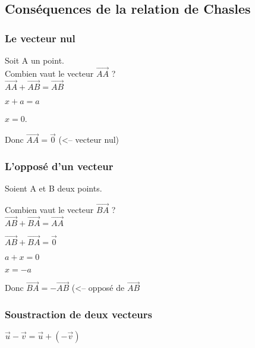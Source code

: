 \subsection{Conséquences de la relation de Chasles}

\subsubsection{Le vecteur nul}

Soit A un point. \\

Combien vaut le vecteur $\overrightarrow{AA}$ ? \\


$\overrightarrow{AA} + \overrightarrow{AB} = \overrightarrow{AB}$

$ x + a = a $

$ x = 0 $.

Donc $\overrightarrow{AA} = \overrightarrow{0}$ (<-- vecteur nul) \\

\subsubsection{L'opposé d'un vecteur}

Soient A et B deux points.


Combien vaut le vecteur $\overrightarrow{BA}$ ? \\


$\overrightarrow{AB} + \overrightarrow{BA} = \overrightarrow{AA}$

$\overrightarrow{AB} + \overrightarrow{BA} = \overrightarrow{0}$

$ a + x = 0 $

$ x = - a $

Donc $\overrightarrow{BA} = -\overrightarrow{AB}$ (<-- opposé de $\overrightarrow{AB}$

\subsubsection{Soustraction de deux vecteurs}


$\overrightarrow{u} - \overrightarrow{v} = \overrightarrow{u}+\left(-\overrightarrow{v}\right)$

